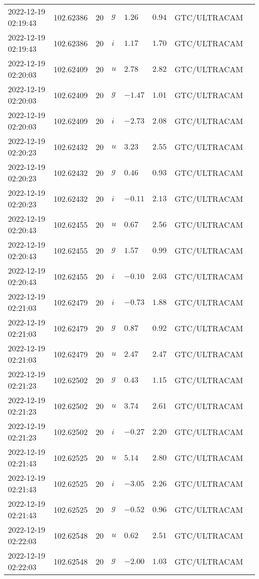 \documentclass{nature_plusfigure}
\begin{document}
\begin{supplement}
\begin{center}
\begin{longtable}{llllllll}
2022-12-19 02:19:43 & 102.62386 & 20 & $g$ & $1.26$ & $0.94$ & GTC/ULTRACAM &  \\ 
2022-12-19 02:19:43 & 102.62386 & 20 & $i$ & $1.17$ & $1.70$ & GTC/ULTRACAM &  \\ 
2022-12-19 02:20:03 & 102.62409 & 20 & $u$ & $2.78$ & $2.82$ & GTC/ULTRACAM &  \\ 
2022-12-19 02:20:03 & 102.62409 & 20 & $g$ & $-1.47$ & $1.01$ & GTC/ULTRACAM &  \\ 
2022-12-19 02:20:03 & 102.62409 & 20 & $i$ & $-2.73$ & $2.08$ & GTC/ULTRACAM &  \\ 
2022-12-19 02:20:23 & 102.62432 & 20 & $u$ & $3.23$ & $2.55$ & GTC/ULTRACAM &  \\ 
2022-12-19 02:20:23 & 102.62432 & 20 & $g$ & $0.46$ & $0.93$ & GTC/ULTRACAM &  \\ 
2022-12-19 02:20:23 & 102.62432 & 20 & $i$ & $-0.11$ & $2.13$ & GTC/ULTRACAM &  \\ 
2022-12-19 02:20:43 & 102.62455 & 20 & $u$ & $0.67$ & $2.56$ & GTC/ULTRACAM &  \\ 
2022-12-19 02:20:43 & 102.62455 & 20 & $g$ & $1.57$ & $0.99$ & GTC/ULTRACAM &  \\ 
2022-12-19 02:20:43 & 102.62455 & 20 & $i$ & $-0.10$ & $2.03$ & GTC/ULTRACAM &  \\ 
2022-12-19 02:21:03 & 102.62479 & 20 & $i$ & $-0.73$ & $1.88$ & GTC/ULTRACAM &  \\ 
2022-12-19 02:21:03 & 102.62479 & 20 & $g$ & $0.87$ & $0.92$ & GTC/ULTRACAM &  \\ 
2022-12-19 02:21:03 & 102.62479 & 20 & $u$ & $2.47$ & $2.47$ & GTC/ULTRACAM &  \\ 
2022-12-19 02:21:23 & 102.62502 & 20 & $g$ & $0.43$ & $1.15$ & GTC/ULTRACAM &  \\ 
2022-12-19 02:21:23 & 102.62502 & 20 & $u$ & $3.74$ & $2.61$ & GTC/ULTRACAM &  \\ 
2022-12-19 02:21:23 & 102.62502 & 20 & $i$ & $-0.27$ & $2.20$ & GTC/ULTRACAM &  \\ 
2022-12-19 02:21:43 & 102.62525 & 20 & $u$ & $5.14$ & $2.80$ & GTC/ULTRACAM &  \\ 
2022-12-19 02:21:43 & 102.62525 & 20 & $i$ & $-3.05$ & $2.26$ & GTC/ULTRACAM &  \\ 
2022-12-19 02:21:43 & 102.62525 & 20 & $g$ & $-0.52$ & $0.96$ & GTC/ULTRACAM &  \\ 
2022-12-19 02:22:03 & 102.62548 & 20 & $u$ & $0.62$ & $2.51$ & GTC/ULTRACAM &  \\ 
2022-12-19 02:22:03 & 102.62548 & 20 & $g$ & $-2.00$ & $1.03$ & GTC/ULTRACAM &  \\ 

\end{longtable}
\end{center}
\end{supplement}
\end{document}
